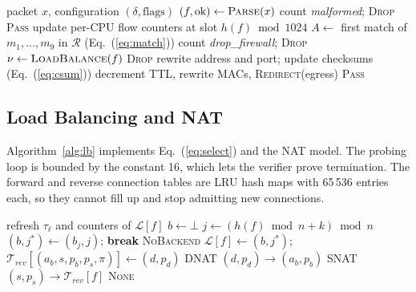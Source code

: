 \documentclass[conference]{IEEEtran}
\begin{document}
\begin{algorithm}[t]
\caption{Per-packet data-plane pipeline}
\label{alg:pipeline}
\begin{algorithmic}[1]
\REQUIRE packet $x$, configuration $(\delta,\text{flags})$
\STATE $(f,\text{ok}) \gets \textsc{Parse}(x)$ 
  \STATE count \textit{malformed}; \RETURN \textsc{Drop}
\ENDIF
{}
  \RETURN \textsc{Pass} 
\ENDIF
\STATE update per-CPU flow counters at slot $h(f) \bmod 1024$
\STATE $A \gets$ first match of $m_1,\dots,m_9$ in $\mathcal{R}$ (Eq.~(\ref{eq:match}))
  \STATE count \textit{drop\_firewall}; \RETURN \textsc{Drop}
\ENDIF
\STATE $\nu \gets \textsc{LoadBalance}(f)$ 
  \RETURN \textsc{Drop}
\ENDIF
{}
  \STATE rewrite address and port; update checksums (Eq.~(\ref{eq:csum}))
\ENDIF
{}
  \STATE decrement TTL, rewrite MACs, \RETURN \textsc{Redirect}(egress)
\ENDIF
\RETURN \textsc{Pass}
\end{algorithmic}
\end{algorithm}

\subsection{Load Balancing and NAT}
Algorithm~\ref{alg:lb} implements Eq.~(\ref{eq:select}) and the NAT model.
The probing loop is bounded by the constant 16, which lets the verifier prove
termination. The forward and reverse connection tables are LRU hash maps with
65\,536 entries each, so they cannot fill up and stop admitting new
connections.

\begin{algorithm}[t]
\caption{\textsc{LoadBalance}$(f)$}
\label{alg:lb}
\begin{algorithmic}[1]
    \STATE refresh $\tau_\ell$ and counters of $\mathcal{L}[f]$
  \ELSE
    \STATE $b \gets \bot$
      \STATE $j \gets (h(f) \bmod n + k) \bmod n$
        \STATE $(b, j^*) \gets (b_j, j)$; \textbf{break}
      \ENDIF
    \ENDFOR
      \RETURN \textsc{NoBackend}
    \ENDIF
    \STATE $\mathcal{L}[f] \gets (b,j^*)$;
           $\mathcal{T}_{rev}[(a_b,s,p_b,p_s,\pi)] \gets (d,p_d)$
  \ENDIF
  \RETURN DNAT $(d,p_d) \to (a_b,p_b)$
  \RETURN SNAT $(s,p_s) \to \mathcal{T}_{rev}[f]$
\ENDIF
\RETURN \textsc{None}
\end{algorithmic}
\end{algorithm}
\end{document}

